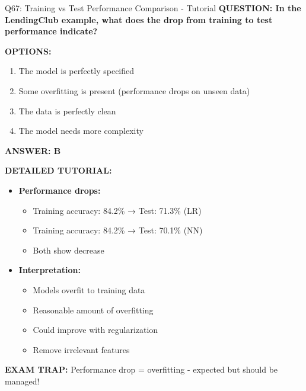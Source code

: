 \documentclass[8pt]{beamer}
\begin{document}
	\begin{frame}{Q67: Training vs Test Performance Comparison - Tutorial}
		\fontsize{6.5}{7.5}\selectfont
		\textbf{QUESTION: In the LendingClub example, what does the drop from training to test performance indicate?}
		
		\vspace{0.1cm}
		\textbf{OPTIONS:}
		\begin{enumerate}
			\item The model is perfectly specified
			\item Some overfitting is present (performance drops on unseen data)
			\item The data is perfectly clean
			\item The model needs more complexity
		\end{enumerate}
		
		\vspace{0.1cm}
		\textcolor{myblue}{\textbf{ANSWER: B}}
		
		\vspace{0.1cm}
		\textbf{DETAILED TUTORIAL:}
		\begin{itemize}
			\item \textbf{Performance drops:}
			\begin{itemize}
				\item Training accuracy: 84.2\% → Test: 71.3\% (LR)
				\item Training accuracy: 84.2\% → Test: 70.1\% (NN)
				\item Both show decrease
			\end{itemize}
			\item \textbf{Interpretation:}
			\begin{itemize}
				\item Models overfit to training data
				\item Reasonable amount of overfitting
				\item Could improve with regularization
				\item Remove irrelevant features
			\end{itemize}
		\end{itemize}
		
		\textcolor{myred}{\textbf{EXAM TRAP:}} Performance drop = \textcolor{myblue}{overfitting} - expected but should be managed!
	\end{frame}
	
\end{document}
